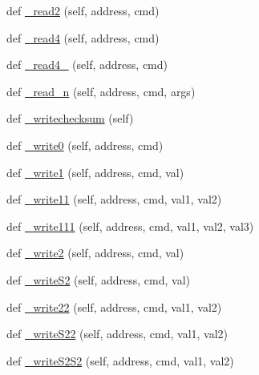 \begin{DoxyCompactItemize}
\item 
def \mbox{\hyperlink{classtoxic__hardware_1_1roboclaw__3_1_1Roboclaw_a919ba025a36abeed59c6796241f20aae}{\+\_\+read2}} (self, address, cmd)
\item 
def \mbox{\hyperlink{classtoxic__hardware_1_1roboclaw__3_1_1Roboclaw_a3961ead7995b0041917cb683860b8988}{\+\_\+read4}} (self, address, cmd)
\item 
def \mbox{\hyperlink{classtoxic__hardware_1_1roboclaw__3_1_1Roboclaw_add9dfd27fac297cd62471d951e483242}{\+\_\+read4\+\_}} (self, address, cmd)
\item 
def \mbox{\hyperlink{classtoxic__hardware_1_1roboclaw__3_1_1Roboclaw_a81393dfbfeb90da31268d1c0637bc8d7}{\+\_\+read\+\_\+n}} (self, address, cmd, args)
\item 
def \mbox{\hyperlink{classtoxic__hardware_1_1roboclaw__3_1_1Roboclaw_a9d1b09b36576cb2666868a50d6ab2d8d}{\+\_\+writechecksum}} (self)
\item 
def \mbox{\hyperlink{classtoxic__hardware_1_1roboclaw__3_1_1Roboclaw_afae53b50ecfd65be213fd04fa10f8ed1}{\+\_\+write0}} (self, address, cmd)
\item 
def \mbox{\hyperlink{classtoxic__hardware_1_1roboclaw__3_1_1Roboclaw_ae1dccf585edb67bb9f112e166226d8b1}{\+\_\+write1}} (self, address, cmd, val)
\item 
def \mbox{\hyperlink{classtoxic__hardware_1_1roboclaw__3_1_1Roboclaw_a0177784176cd441bffdd4052b19387d2}{\+\_\+write11}} (self, address, cmd, val1, val2)
\item 
def \mbox{\hyperlink{classtoxic__hardware_1_1roboclaw__3_1_1Roboclaw_a9c6be0d5ee6ad35f690c6cef134b0bbb}{\+\_\+write111}} (self, address, cmd, val1, val2, val3)
\item 
def \mbox{\hyperlink{classtoxic__hardware_1_1roboclaw__3_1_1Roboclaw_a8d6760321f0e158a39568ef061112c4f}{\+\_\+write2}} (self, address, cmd, val)
\item 
def \mbox{\hyperlink{classtoxic__hardware_1_1roboclaw__3_1_1Roboclaw_a0fc76d80246786b74d7e5b7871e82733}{\+\_\+write\+S2}} (self, address, cmd, val)
\item 
def \mbox{\hyperlink{classtoxic__hardware_1_1roboclaw__3_1_1Roboclaw_aba67d9079729e4e6cb6b8aff61435d12}{\+\_\+write22}} (self, address, cmd, val1, val2)
\item 
def \mbox{\hyperlink{classtoxic__hardware_1_1roboclaw__3_1_1Roboclaw_a73cb52edc8e25d6b49eea531c0aa5534}{\+\_\+write\+S22}} (self, address, cmd, val1, val2)
\item 
def \mbox{\hyperlink{classtoxic__hardware_1_1roboclaw__3_1_1Roboclaw_adcaec09c9193050e8af3f8c58e91d6e9}{\+\_\+write\+S2\+S2}} (self, address, cmd, val1, val2)

\end{DoxyCompactItemize}
